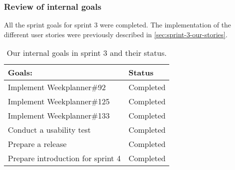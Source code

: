 \subsubsection{Review of internal goals}
All the sprint goals for sprint 3 were completed.
The implementation of the different user stories were previously described in \autoref{sec:sprint-3-our-stories}.
\begin{table}[H]
    \centering
    \begin{tabular}{|l|l|}
    \hline
    Goals:                            & Status        \\ \hline
    Implement Weekplanner\#92         & Completed      \\ \hline
    Implement Weekplanner\#125        & Completed      \\ \hline
    Implement Weekplanner\#133        & Completed      \\ \hline
    Conduct a usability test          & Completed       \\ \hline
    Prepare a release                 & Completed         \\ \hline
    Prepare introduction for sprint 4 & Completed                        \\ \hline
    \end{tabular}
    \caption{Our internal goals in sprint 3 and their status.}
    \label{PO-goal-sprint-3-status}
\end{table}
